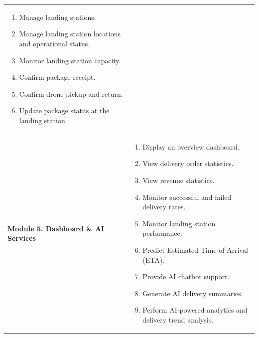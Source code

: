 \begin{longtable}{@{}p{4cm}p{9cm}@{}}
\begin{enumerate}
  \item Manage landing stations.
  \item Manage landing station locations and operational status.
  \item Monitor landing station capacity.
  \item Confirm package receipt.
  \item Confirm drone pickup and return.
  \item Update package status at the landing station.
\end{enumerate} \\
\addlinespace
\textbf{Module 5. Dashboard \& AI Services} &
\begin{enumerate}
  \item Display an overview dashboard.
  \item View delivery order statistics.
  \item View revenue statistics.
  \item Monitor successful and failed delivery rates.
  \item Monitor landing station performance.
  \item Predict Estimated Time of Arrival (ETA).
  \item Provide AI chatbot support.
  \item Generate AI delivery summaries.
  \item Perform AI-powered analytics and delivery trend analysis.
\end{enumerate} \\
\bottomrule
\end{longtable}
